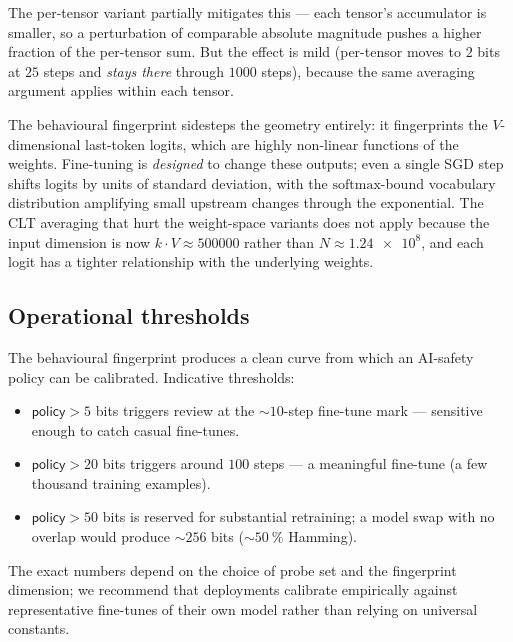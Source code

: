 \documentclass[11pt,a4paper]{article}
\begin{document}
The per\nobreakdash-tensor variant partially mitigates this — each
tensor's accumulator is smaller, so a perturbation of comparable
absolute magnitude pushes a higher fraction of the per\nobreakdash-tensor
sum.  But the effect is mild (per\nobreakdash-tensor moves to $2$
bits at $25$ steps and \emph{stays there} through $1000$ steps),
because the same averaging argument applies within each tensor.

The behavioural fingerprint sidesteps the geometry entirely: it
fingerprints the $V$\nobreakdash-dimensional last\nobreakdash-token logits,
which are highly non\nobreakdash-linear functions of the weights.
Fine\nobreakdash-tuning is \emph{designed} to change these outputs;
even a single SGD step shifts logits by units of standard
deviation, with the $\mathrm{softmax}$\nobreakdash-bound vocabulary
distribution amplifying small upstream changes through the
exponential.  The CLT averaging that hurt the weight\nobreakdash-space
variants does not apply because the input dimension is now
$k \cdot V \approx \num{500000}$ rather than $N \approx
\num{1.24e8}$, and each logit has a tighter relationship with the
underlying weights.

\subsection{Operational thresholds}
\label{sec:model:thresholds}

The behavioural fingerprint produces a clean curve from which an
AI\nobreakdash-safety policy can be calibrated.  Indicative thresholds:

\begin{itemize}
  \item $\textsf{policy} > 5$ bits triggers review at the $\sim\!10$\nobreakdash-step
        fine\nobreakdash-tune mark — sensitive enough to catch
        casual fine\nobreakdash-tunes.
  \item $\textsf{policy} > 20$ bits triggers around $100$ steps —
        a meaningful fine\nobreakdash-tune (a few thousand training
        examples).
  \item $\textsf{policy} > 50$ bits is reserved for substantial
        retraining; a model swap with no overlap would produce
        $\sim\!256$ bits ($\sim\!\SI{50}{\percent}$ Hamming).
\end{itemize}

The exact numbers depend on the choice of probe set and the
fingerprint dimension; we recommend that deployments calibrate
empirically against representative fine\nobreakdash-tunes of their
own model rather than relying on universal constants.
\end{document}
